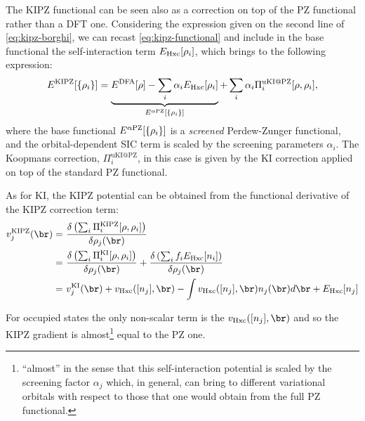 The KIPZ functional can be seen also as a correction on top of the PZ functional rather than a DFT one. Considering the expression given on the second line of \cref{eq:kipz-borghi}, we can recast \cref{eq:kipz-functional} and include in the base functional the self-interaction term $E_{\rm Hxc}[\rho_i]$, which brings to the following expression:
%
\begin{equation}
    E^{\rm KIPZ}[\{\rho_i\}] = \underbrace{E^{\rm DFA}[\rho] - \sum_i \alpha_i E_{\rm Hxc}[\rho_i]}_{E^{\alpha\rm PZ}[\{\rho_i\}]} + \sum_i {\alpha_i} \Pi^{\text{uKI@PZ}}_i[\rho,\rho_i] ,
    \label{eq:kipz-as-ki-on-pz}
\end{equation}
%
where the base functional $E^{\alpha\rm PZ}[\{\rho_i\}]$ is a \emph{screened} Perdew-Zunger functional, and the orbital-dependent SIC term is scaled by the screening parameters $\alpha_i$. The Koopmans correction, $\Pi^{\text{uKI@PZ}}_i$, in this case is given by the KI correction applied on top of the standard PZ functional.

As for KI, the KIPZ potential can be obtained from the functional derivative of the KIPZ correction term:
%
\begin{equation}
    \begin{split}
        v^{\rm KIPZ}_j(\br) =\ &\frac{\delta \left( \sum_i \Pi^{\rm KIPZ}_i[\rho,\rho_i] \right)}{\delta \rho_j(\br)} \\
        =\ &\frac{\delta \left( \sum_i \Pi^{\text{KI}}_i[\rho,\rho_i] \right)}{\delta \rho_j(\br)} + 
        \frac{\delta \left( \sum_i f_i E_{\rm Hxc}[n_i] \right)}{\delta \rho_j(\br)} \\
        =\ &v^{\text{KI}}_j(\br) + v_{\rm Hxc}([n_j],\br) - \int v_{\rm Hxc}([n_j],\br) n_j(\br) d\br + E_{\rm Hxc}[n_j]
    \end{split}
    \label{eq:kipz-pot-full}
\end{equation}

For occupied states the only non-scalar term is the $v_{\rm Hxc}([n_j],\br)$ and so the KIPZ gradient is almost\footnote{``almost'' in the sense that this self-interaction potential is scaled by the screening factor $\alpha_j$ which, in general, can bring to different variational orbitals with respect to those that one would obtain from the full PZ functional.} equal to the PZ one.